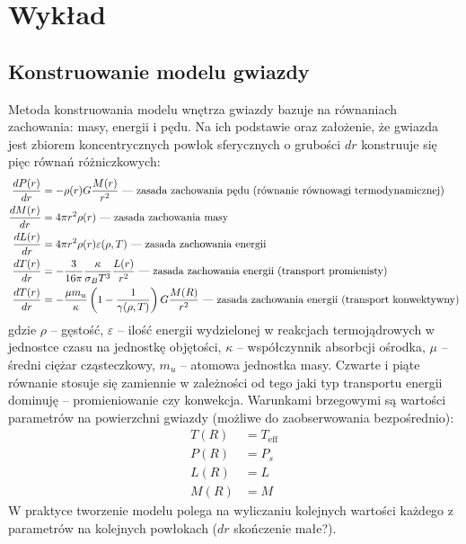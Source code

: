 \documentclass[../index.tex]{subfiles}
\begin{document}
    \section{Wykład}
        \subsection{Konstruowanie modelu gwiazdy}
            Metoda konstruowania modelu wnętrza gwiazdy bazuje na równaniach zachowania: masy, energii i pędu. Na ich podstawie oraz założenie, że gwiazda jest zbiorem koncentrycznych powłok sferycznych o grubości \(dr\) konstruuje się pięc równań różniczkowych:
            \begin{align}
                \frac{dP(r)}{dr} &=  -\rho(r)G \frac{M(r)}{r^2 } \text{ — zasada zachowania pędu (równanie równowagi termodynamicznej)}\\
                \frac{dM(r)}{dr} &=  4\pi r^2 \rho(r) \text{ — zasada zachowania masy} \\
                \frac{dL(r)}{dr} &= 4\pi r^2 \rho(r)\varepsilon(\rho,T) \text{ — zasada zachowania energii}\\
                \frac{dT(r)}{dr} &= - \frac{3}{16\pi} \frac{\kappa}{\sigma_B T^3 }\frac{L(r)}{r^2 } \text{ — zasada zachowania energii (transport promienisty)} \\
                \frac{dT(r)}{dr} &= - \frac{\mu m_u}{\kappa} \left(1 - \frac{1}{\gamma(\rho,T)}\right) G \frac{M(R)}{r^2 } \text{ — zasada zachowania energii (transport konwektywny)} 
            \end{align}
            gdzie \(\rho\) – gęstość, \(\varepsilon\) – ilość energii wydzielonej w reakcjach termojądrowych w jednostce czasu na jednostkę objętości, \(\kappa\) – współczynnik absorbcji ośrodka, \(\mu\) – średni ciężar cząsteczkowy, \(m_u\) – atomowa jednostka masy. Czwarte i piąte równanie stosuje się zamiennie w zależności od tego jaki typ transportu energii dominuję – promieniowanie czy konwekcja. Warunkami brzegowymi są wartości parametrów na powierzchni gwiazdy (możliwe do zaobserwowania bezpośrednio):
            \begin{align*}
                T(R) &=  T_\text{eff} \\
                P(R) &= P_s \\
                L(R) &= L \\
                M(R) &=  M
            \end{align*}
            W praktyce tworzenie modelu polega na wyliczaniu kolejnych wartości każdego z parametrów na kolejnych powłokach (\(dr\) skończenie małe?).
\end{document}
